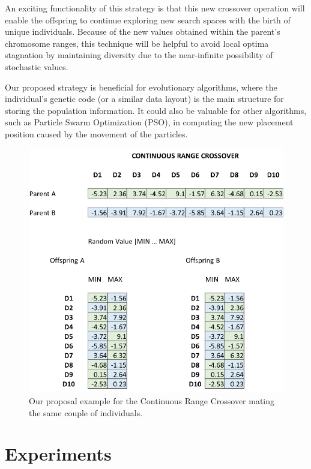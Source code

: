 \documentclass[graybox]{svmult}
\begin{document}
    An exciting functionality of this strategy is that this new crossover operation will enable the offspring to continue exploring new search spaces with the birth of unique individuals. Because of the new values obtained within the parent's chromosome ranges, this technique will be helpful to avoid local optima stagnation by maintaining diversity due to the near-infinite possibility of stochastic values.

    Our proposed strategy is beneficial for evolutionary algorithms, where the individual's genetic code (or a similar data layout) is the main structure for storing the population information. It could also be valuable for other algorithms, such as Particle Swarm Optimization (PSO), in computing the new placement position caused by the movement of the particles.

    \begin{figure}[!ht]
        \centering
        \includegraphics[width=0.90\linewidth]{img/fig_contrange_crossover.pdf}
        \caption{Our proposal example for the Continuous Range Crossover mating the same couple of individuals.} \label{fig.contrange_crossover}
        \end{figure}        
    
    \FloatBarrier


\section{Experiments}
    \label{section.experiments}
\end{document}
